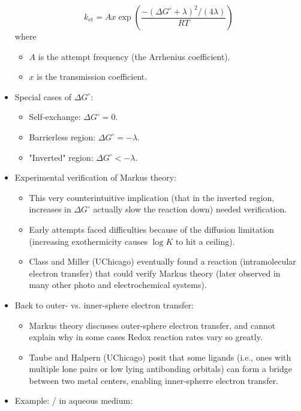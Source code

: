 \documentclass[../notes.tex]{subfiles}
\begin{document}
\begin{itemize}
    \begin{equation*}
        k_\text{et} = Ax\exp\left( \frac{-(\Delta G^\circ+\lambda)^2/(4\lambda)}{RT} \right)
    \end{equation*}
    where
    \begin{itemize}
        \item $A$ is the attempt frequency (the Arrhenius coefficient).
        \item $x$ is the transmission coefficient.
    \end{itemize}
    \item Special cases of $\Delta G^\circ$:
    \begin{itemize}
        \item Self-exchange: $\Delta G^\circ=0$.
        \item Barrierless region: $\Delta G^\circ=-\lambda$.
        \item "Inverted" region: $\Delta G^\circ<-\lambda$.
    \end{itemize}
    \item Experimental verification of Markus theory:
    \begin{itemize}
        \item This very counterintuitive implication (that in the inverted region, increases in $\Delta G^\circ$ actually slow the reaction down) needed verification.
        \item Early attempts faced difficulties because of the diffusion limitation (increasing exothermicity causes $\log K$ to hit a ceiling).
        \item Class and Miller (UChicago) eventually found a reaction (intramolecular electron transfer) that could verify Markus theory (later observed in many other photo and electrochemical systems).
    \end{itemize}
    \item Back to outer- vs. inner-sphere electron transfer:
    \begin{itemize}
        \item Markus theory discusses outer-sphere electron transfer, and cannot explain why in some cases Redox reaction rates vary so greatly.
        \item Taube and Halpern (UChicago) posit that some ligands (i.e., ones with multiple lone pairs or low lying antibonding orbitals) can form a bridge between two metal centers, enabling inner-spherre electron transfer.
    \end{itemize}
    \item Example:  /  in aqueous medium:

\end{itemize}
\end{document}
